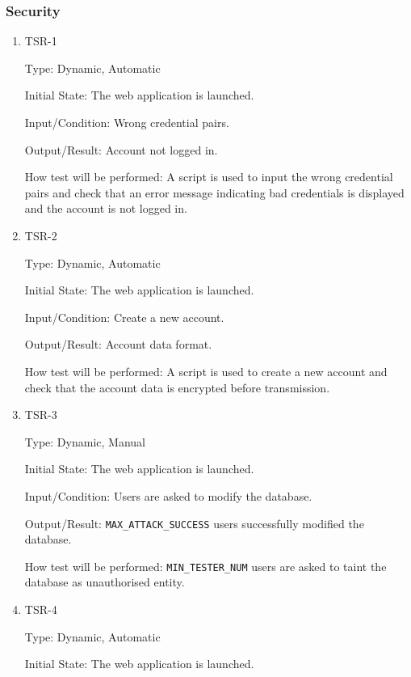 \documentclass[12pt, titlepage]{article}
\begin{document}
\subsubsection{Security}

\begin{enumerate}
\item{TSR-1\\}\label{TSR-1}

Type: Dynamic, Automatic
					
Initial State: The web application is launched.
					
Input/Condition: Wrong credential pairs.
					
Output/Result: Account not logged in.
					
How test will be performed: A script is used to input the wrong credential pairs and check that an error message indicating bad credentials is displayed and the account is not logged in.

\item{TSR-2\\}\label{TSR-2}

Type: Dynamic, Automatic
					
Initial State: The web application is launched.
					
Input/Condition: Create a new account.
					
Output/Result: Account data format.
					
How test will be performed: A script is used to create a new account and check that the account data is encrypted before transmission.

\item{TSR-3\\}\label{TSR-3}

Type: Dynamic, Manual
					
Initial State: The web application is launched.
					
Input/Condition: Users are asked to modify the database.
					
Output/Result: \texttt{MAX\_ATTACK\_SUCCESS} users successfully modified the database.
					
How test will be performed: \texttt{MIN\_TESTER\_NUM} users are asked to taint the database as unauthorised entity.

\item{TSR-4\\}\label{TSR-4}

Type: Dynamic, Automatic
					
Initial State: The web application is launched.
					

\end{enumerate}
\end{document}
